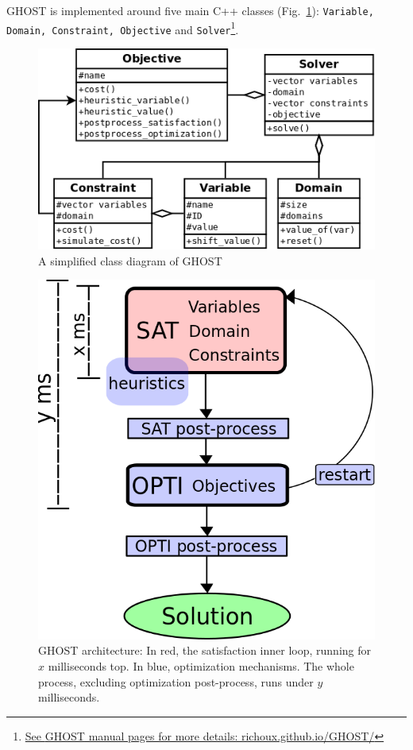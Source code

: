 \documentclass[journal]{IEEEtran}
\newcommand{\ghost}{\textsc{GHOST}\xspace}
\begin{document}
\ghost    is    implemented    around   five    main    C++    classes
(Fig.~\ref{fig:ghost}):    \texttt{Variable,    Domain,    Constraint,
  Objective}                                                       and
\texttt{Solver}\footnote{\href{http://richoux.github.io/GHOST/}{See
    \ghost manual pages for more details: richoux.github.io/GHOST/}}.
\begin{figure}[th]
  \centering
  \includegraphics[width=\columnwidth]{figs/ghost.png}
  \caption{A simplified class diagram of \ghost}
  \label{fig:ghost}
\end{figure}
\begin{figure}[th]
  \centering
  \includegraphics[width=\columnwidth]{figs/archi2.png}
  \caption{\ghost architecture: In red, the satisfaction inner
    loop,  running  for  $x$  milliseconds top.  In  blue,  optimization
    mechanisms.    The   whole    process,   excluding    optimization
    post-process, runs under $y$ milliseconds.}
  \label{fig:archi}
\end{figure}
\end{document}
